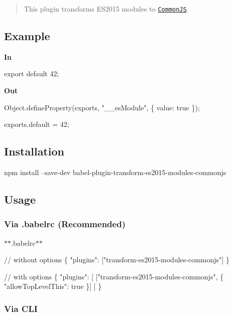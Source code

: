 \begin{quote}
This plugin transforms E\+S2015 modules to \href{http://wiki.commonjs.org/wiki/Modules/1.1}{\tt Common\+JS}. \end{quote}


\subsection*{Example}

{\bfseries In}


\begin{DoxyCode}
export default 42;
\end{DoxyCode}


{\bfseries Out}


\begin{DoxyCode}
Object.defineProperty(exports, "\_\_esModule", \{
  value: true
\});

exports.default = 42;
\end{DoxyCode}


\subsection*{Installation}


\begin{DoxyCode}
npm install --save-dev babel-plugin-transform-es2015-modules-commonjs
\end{DoxyCode}


\subsection*{Usage}

\subsubsection*{Via {\ttfamily .babelrc} (Recommended)}

$\ast$$\ast$.babelrc$\ast$$\ast$


\begin{DoxyCode}
// without options
\{
  "plugins": ["transform-es2015-modules-commonjs"]
\}

// with options
\{
  "plugins": [
    ["transform-es2015-modules-commonjs", \{
      "allowTopLevelThis": true
    \}]
  ]
\}
\end{DoxyCode}


\subsubsection*{Via C\+LI}


